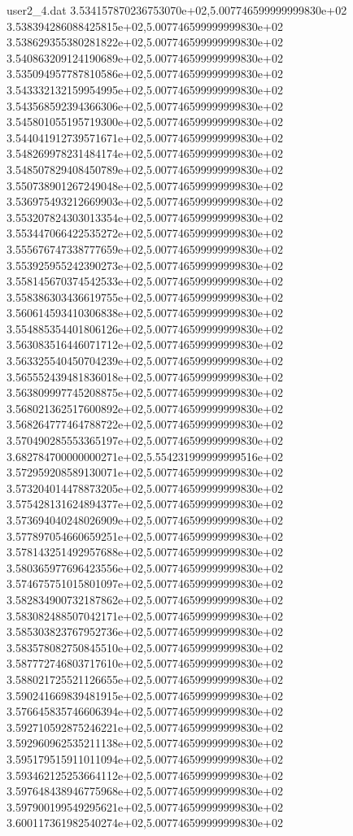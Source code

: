 \begin{filecontents}{user2_4.dat}
3.534157870236753070e+02,5.007746599999999830e+02
3.538394286088425815e+02,5.007746599999999830e+02
3.538629355380281822e+02,5.007746599999999830e+02
3.540863209124190689e+02,5.007746599999999830e+02
3.535094957787810586e+02,5.007746599999999830e+02
3.543332132159954995e+02,5.007746599999999830e+02
3.543568592394366306e+02,5.007746599999999830e+02
3.545801055195719300e+02,5.007746599999999830e+02
3.544041912739571671e+02,5.007746599999999830e+02
3.548269978231484174e+02,5.007746599999999830e+02
3.548507829408450789e+02,5.007746599999999830e+02
3.550738901267249048e+02,5.007746599999999830e+02
3.536975493212669903e+02,5.007746599999999830e+02
3.553207824303013354e+02,5.007746599999999830e+02
3.553447066422535272e+02,5.007746599999999830e+02
3.555676747338777659e+02,5.007746599999999830e+02
3.553925955242390273e+02,5.007746599999999830e+02
3.558145670374542533e+02,5.007746599999999830e+02
3.558386303436619755e+02,5.007746599999999830e+02
3.560614593410306838e+02,5.007746599999999830e+02
3.554885354401806126e+02,5.007746599999999830e+02
3.563083516446071712e+02,5.007746599999999830e+02
3.563325540450704239e+02,5.007746599999999830e+02
3.565552439481836018e+02,5.007746599999999830e+02
3.563809997745208875e+02,5.007746599999999830e+02
3.568021362517600892e+02,5.007746599999999830e+02
3.568264777464788722e+02,5.007746599999999830e+02
3.570490285553365197e+02,5.007746599999999830e+02
3.682784700000000271e+02,5.554231999999999516e+02
3.572959208589130071e+02,5.007746599999999830e+02
3.573204014478873205e+02,5.007746599999999830e+02
3.575428131624894377e+02,5.007746599999999830e+02
3.573694040248026909e+02,5.007746599999999830e+02
3.577897054660659251e+02,5.007746599999999830e+02
3.578143251492957688e+02,5.007746599999999830e+02
3.580365977696423556e+02,5.007746599999999830e+02
3.574675751015801097e+02,5.007746599999999830e+02
3.582834900732187862e+02,5.007746599999999830e+02
3.583082488507042171e+02,5.007746599999999830e+02
3.585303823767952736e+02,5.007746599999999830e+02
3.583578082750845510e+02,5.007746599999999830e+02
3.587772746803717610e+02,5.007746599999999830e+02
3.588021725521126655e+02,5.007746599999999830e+02
3.590241669839481915e+02,5.007746599999999830e+02
3.576645835746606394e+02,5.007746599999999830e+02
3.592710592875246221e+02,5.007746599999999830e+02
3.592960962535211138e+02,5.007746599999999830e+02
3.595179515911011094e+02,5.007746599999999830e+02
3.593462125253664112e+02,5.007746599999999830e+02
3.597648438946775968e+02,5.007746599999999830e+02
3.597900199549295621e+02,5.007746599999999830e+02
3.600117361982540274e+02,5.007746599999999830e+02

\end{filecontents}
